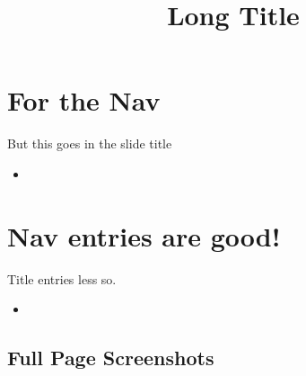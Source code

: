 \documentclass[12pt]{phage3slides} %
\title[Short Title]{Long Title}
\begin{document}
\frame{\titlepage}

\section{For the Nav}
\begin{frame}{But this goes in the slide title}
	\begin{itemize}
		\item \lipsum
	\end{itemize}
\end{frame}

\section{Nav entries are good!}
\begin{frame}{Title entries less so.}
	\begin{itemize}
		\item \lipsum
	\end{itemize}
\end{frame}

\subsection{Full Page Screenshots}
{
  \begin{frame}[plain]
  \end{frame}
}


\informationErasche
\end{document}
